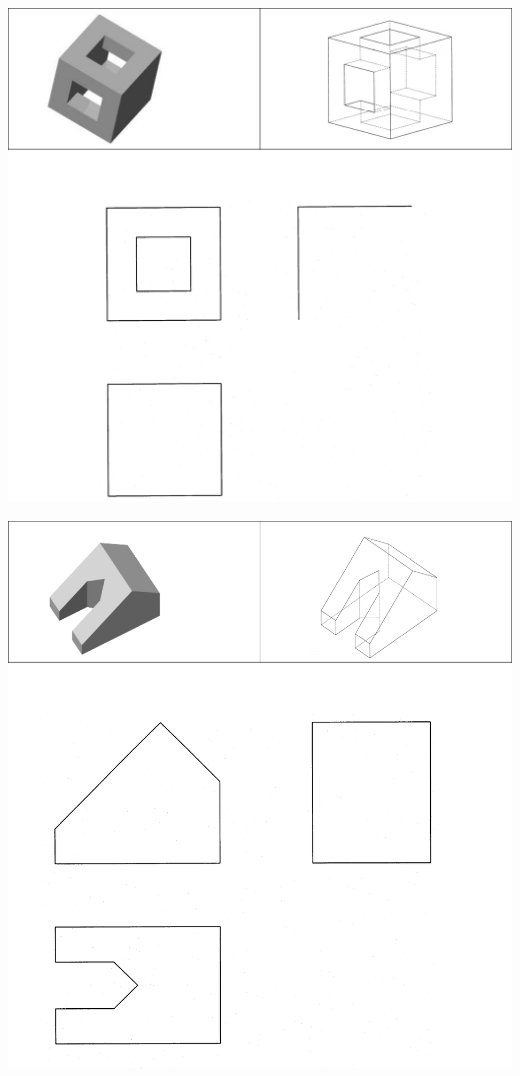 \documentclass[11pt,oneside]{article}
\begin{document}
\begin{center}
\includegraphics[width=.9\textwidth]{png/fig21}
\end{center}

\begin{center}
\includegraphics[width=.9\textwidth]{png/fig22}
\end{center}
\end{document}
